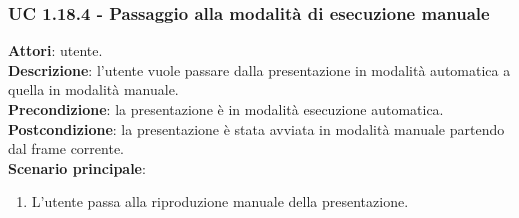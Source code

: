 	\subsubsection{UC 1.18.4 - Passaggio alla modalità di esecuzione manuale}{
		\label{uc1.18.4}
		\textbf{Attori}: utente. \\
		\textbf{Descrizione}: l'utente vuole passare dalla presentazione in modalità automatica a quella in modalità manuale. \\
		\textbf{Precondizione}: la presentazione è in modalità esecuzione automatica.	\\
		\textbf{Postcondizione}: la presentazione è stata avviata in modalità manuale partendo dal frame corrente.\\
		\textbf{Scenario principale}:
		\begin{enumerate}
			\item L'utente passa alla riproduzione manuale della presentazione.
		\end{enumerate}						
	}